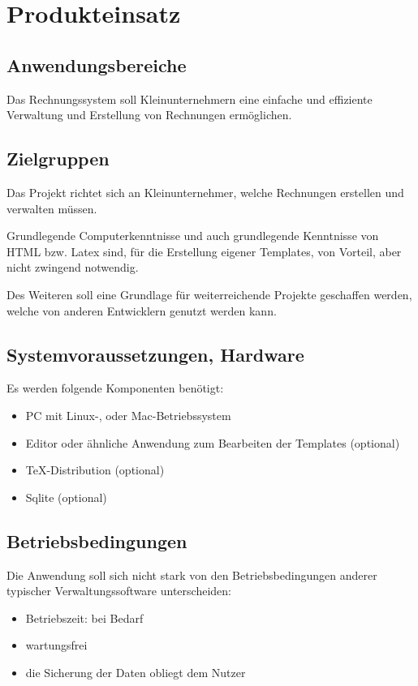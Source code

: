 
\section{Produkteinsatz}


\subsection{Anwendungsbereiche}

Das Rechnungssystem soll Kleinunternehmern eine einfache und effiziente Verwaltung und Erstellung von Rechnungen ermöglichen.

\subsection{Zielgruppen}

Das Projekt richtet sich an Kleinunternehmer, welche Rechnungen erstellen und verwalten müssen.

Grundlegende Computerkenntnisse und auch grundlegende Kenntnisse von HTML bzw. Latex sind, für die Erstellung eigener Templates, von Vorteil, aber nicht zwingend notwendig.

Des Weiteren soll eine Grundlage für weiterreichende Projekte geschaffen werden, welche von anderen Entwicklern genutzt werden kann.

\subsection{Systemvoraussetzungen, Hardware}
Es werden folgende Komponenten benötigt:
\begin{itemize}
	\item PC mit Linux-, oder Mac-Betriebssystem
	\item Editor oder ähnliche Anwendung zum Bearbeiten der Templates (optional)
	\item TeX-Distribution (optional)
	\item Sqlite (optional)
\end{itemize}

\subsection{Betriebsbedingungen}
Die Anwendung soll sich nicht stark von den Betriebsbedingungen anderer typischer Verwaltungssoftware unterscheiden:

\begin{itemize}
	\item Betriebszeit: bei Bedarf
	\item wartungsfrei
	\item die Sicherung der Daten obliegt dem Nutzer
\end{itemize}
